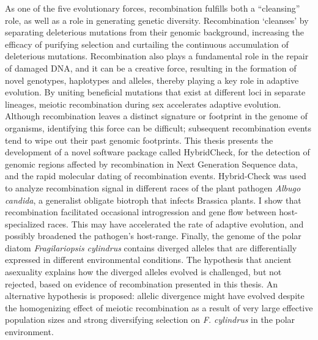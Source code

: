 As one of the five evolutionary forces, recombination fulfills both a “cleansing” role, as well as a role in generating genetic diversity.
Recombination ‘cleanses’ by separating deleterious mutations from their genomic background, increasing the efficacy of purifying selection and curtailing the continuous accumulation of deleterious mutations.
Recombination also plays a fundamental role in the repair of damaged DNA, and it can be a creative force, resulting in the formation of novel genotypes, haplotypes and alleles, thereby playing a key role in adaptive evolution.
By uniting beneficial mutations that exist at different loci in separate lineages, meiotic recombination during sex accelerates adaptive evolution.
Although recombination leaves a distinct signature or footprint in the genome of organisms, identifying this force can be difficult; subsequent recombination events tend to wipe out their past genomic footprints.
This thesis presents the development of a novel software package called HybridCheck, for the detection of genomic regions affected by recombination in Next Generation Sequence data, and the rapid molecular dating of recombination events.
Hybrid-Check was used to analyze recombination signal in different races of the plant pathogen \textit{Albugo candida}, a generalist obligate biotroph that infects Brassica plants.
I show that recombination facilitated occasional introgression and gene flow between host-specialized races.
This may have accelerated the rate of adaptive evolution, and possibly broadened the pathogen's host-range.
Finally, the genome of the polar diatom \textit{Fragilariopsis cylindrus} contains diverged alleles that are differentially expressed in different environmental conditions.
The hypothesis that ancient asexuality explains how the diverged alleles evolved is challenged, but not rejected, based on evidence of recombination presented in this thesis.
An alternative hypothesis is proposed: allelic divergence might have evolved despite the homogenizing effect of meiotic recombination as a result of very large effective population sizes and strong diversifying selection on \textit{F. cylindrus} in the polar environment.
